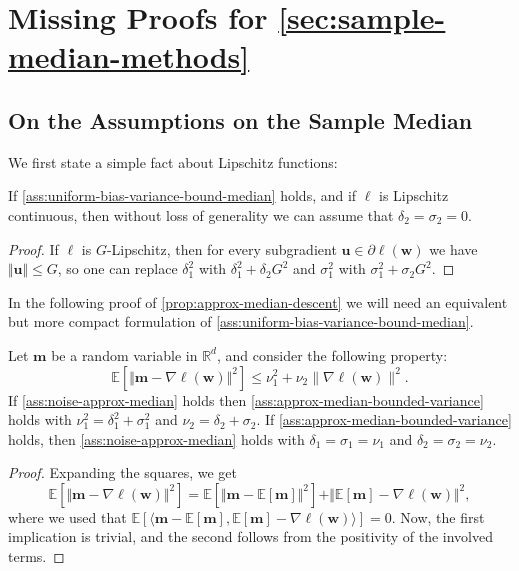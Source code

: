 \documentclass[10pt]{article} %
\renewcommand{\vec}[1]{\bm{#1}}
\newcommand{\bw}{\bm{w}}
\newcommand{\m}{\bm{m}}
\newcommand{\E}[1]{\mathbb{E}\left[#1\right] }
\begin{document}
%
\section{Missing Proofs for \cref{sec:sample-median-methods}}\label{sec:missing-proofs}

\subsection{On the Assumptions on the Sample Median}

We first state a simple fact about Lipschitz functions:
\begin{lemma}\label{L:oracle purely bouded if lipschitz objective}
    If \cref{ass:uniform-bias-variance-bound-median} holds, and if $\ell$ is Lipschitz continuous, then without loss of generality we can assume that $\delta_2 = \sigma_2=0$.
\end{lemma}

\begin{proof}
    If $\ell$ is $G$-Lipschitz, then for every subgradient $\vec{u} \in \partial \ell(\bw)$ we have $\Vert \vec{u} \Vert \leq G$, so one can replace $\delta_1^2$ with $\delta_1^2 + \delta_2 G^2$ and $\sigma_1^2$ with $\sigma_1^2 + \sigma_2 G^2$.
\end{proof}


In the following proof of \cref{prop:approx-median-descent} we will need an equivalent but more compact formulation of \cref{ass:uniform-bias-variance-bound-median}.
%
\begin{lemma}\label{lem:noise-assum-equiv}
    Let $\m$ be a random variable in $\mathbb{R}^d$, and consider the following property:
    \begin{equation}\label{ass:approx-median-bounded-variance}
        \E{\Vert \vec{m} - \nabla \ell(\vec{w}) \Vert^2} \leq \nu_1^2 + \nu_2 \|\nabla \ell(\bw)\|^2.
    \end{equation}
     If \eqref{ass:noise-approx-median} holds then \eqref{ass:approx-median-bounded-variance} holds with $\nu_1^2 = \delta_1^2+\sigma_1^2 $ and $\nu_2=\delta_2+\sigma_2$.
     If \eqref{ass:approx-median-bounded-variance} holds, then \eqref{ass:noise-approx-median} holds with $\delta_1=\sigma_1 = \nu_1$ and $\delta_2=\sigma_2=\nu_2$.
\end{lemma}
%
\begin{proof}
    Expanding the squares, we get
    \begin{equation*}
        \E{\Vert \vec{m} - \nabla \ell(\vec{w}) \Vert^2}
        =
        \E{\Vert \vec{m} - \E{\vec{m}} \Vert^2}
        +
        \Vert  \E{\vec{m}} - \nabla \ell(\vec{w}) \Vert^2,
    \end{equation*}
    where we used that $\E{\langle \vec{m} - \E{\vec{m}}, \E{\vec{m}} - \nabla \ell(\vec{w}) \rangle} = 0$.
    Now, the first implication is trivial, and the second follows from the positivity of the involved terms.
\end{proof}
\end{document}
